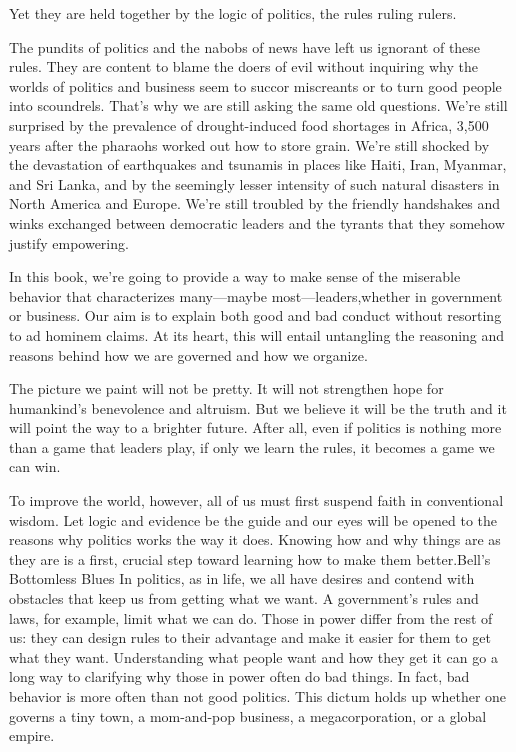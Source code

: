 \documentclass[10pt]{article}
\begin{document}
{\large Yet they are held together by the logic of politics, the rules ruling
rulers.}

{\large The pundits of politics and the nabobs of news have left us ignorant of
these rules. They are content to blame the doers of evil without inquiring why
the worlds of politics and business seem to succor miscreants or to turn good
people into scoundrels. That's why we are still asking the same old questions.
We're still surprised by the prevalence of drought-induced food shortages in
Africa, 3,500 years after the pharaohs worked out how to store grain. We're still
shocked by the devastation of earthquakes and tsunamis in places like Haiti,
Iran, Myanmar, and Sri Lanka, and by the seemingly lesser intensity of such
natural disasters in North America and Europe. We're still troubled by the
friendly handshakes and winks exchanged between democratic leaders and the
tyrants that they somehow justify empowering.}

{\large In this book, we're going to provide a way to make sense of the
miserable behavior that characterizes many---maybe most---leaders,whether in
government or business. Our aim is to explain both good and bad conduct without
resorting to ad hominem claims. At its heart, this will entail untangling the
reasoning and reasons behind how we are governed and how we organize.}

{\large The picture we paint will not be pretty. It will not strengthen hope for
humankind's benevolence and altruism. But we believe it will be the truth and it
will point the way to a brighter future. After all, even if politics is nothing
more than a game that leaders play, if only we learn the rules, it becomes a game
we can win.}

{\large To improve the world, however, all of us must first suspend faith in
conventional wisdom. Let logic and evidence be the guide and our eyes will be
opened to the reasons why politics works the way it does. Knowing how and why
things are as they are is a first, crucial step toward learning how to make them
better.Bell's Bottomless Blues In politics, as in life, we all have desires and
contend with obstacles that keep us from getting what we want. A government's
rules and laws, for example, limit what we can do. Those in power differ from the
rest of us: they can design rules to their advantage and make it easier for them
to get what they want. Understanding what people want and how they get it can go
a long way to clarifying why those in power often do bad things. In fact, bad
behavior is more often than not good politics. This dictum holds up whether one
governs a tiny town, a mom-and-pop business, a megacorporation, or a global
empire.}
\end{document}
